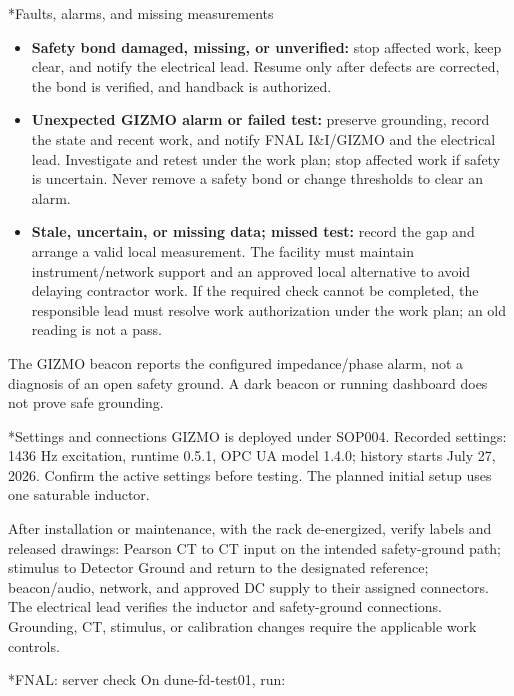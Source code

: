 \documentclass[10pt]{article}
\makeatletter
\renewcommand\section{\@startsection{section}{1}{\z@}{1.2ex plus .2ex}{.6ex}{\normalfont\large\bfseries}}
\makeatother
\begin{document}
\section*{Faults, alarms, and missing measurements}
\begin{itemize}
\item \textbf{Safety bond damaged, missing, or unverified:} stop affected work, keep clear, and notify the electrical lead. Resume only after defects are corrected, the bond is verified, and handback is authorized.
\item \textbf{Unexpected GIZMO alarm or failed test:} preserve grounding, record the state and recent work, and notify FNAL I\&I/GIZMO and the electrical lead. Investigate and retest under the work plan; stop affected work if safety is uncertain. Never remove a safety bond or change thresholds to clear an alarm.
\item \textbf{Stale, uncertain, or missing data; missed test:} record the gap and arrange a valid local measurement. The facility must maintain instrument/network support and an approved local alternative to avoid delaying contractor work. If the required check cannot be completed, the responsible lead must resolve work authorization under the work plan; an old reading is not a pass.
\end{itemize}
The GIZMO beacon reports the configured impedance/phase alarm, not a diagnosis of an open safety ground. A dark beacon or running dashboard does not prove safe grounding.

\section*{Settings and connections}
GIZMO is deployed under SOP004. Recorded settings: 1436 Hz excitation, runtime 0.5.1, OPC UA model 1.4.0; history starts July 27, 2026. Confirm the active settings before testing. The planned initial setup uses one saturable inductor.

After installation or maintenance, with the rack de-energized, verify labels and released drawings: Pearson CT to CT input on the intended safety-ground path; stimulus to Detector Ground and return to the designated reference; beacon/audio, network, and approved DC supply to their assigned connectors. The electrical lead verifies the inductor and safety-ground connections. Grounding, CT, stimulus, or calibration changes require the applicable work controls.

\section*{FNAL: server check}
On dune-fd-test01, run:
\end{document}
